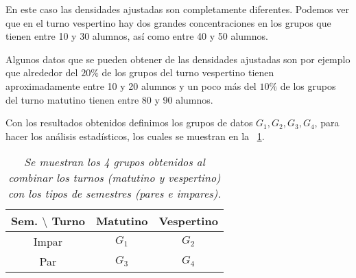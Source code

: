En este caso las densidades ajustadas son completamente diferentes. Podemos ver que en el turno vespertino hay dos grandes concentraciones en los grupos que tienen entre 10 y 30 alumnos, así como entre 40 y 50 alumnos.

Algunos datos que se pueden obtener de las densidades ajustadas son por ejemplo que alrededor del $20\%$ de los grupos del turno vespertino tienen aproximadamente entre 10 y 20 alumnos y un poco más del $10\%$ de los grupos del turno matutino tienen entre 80 y 90 alumnos.


Con los resultados obtenidos definimos los grupos de datos $G_{1}, G_{2}, G_{3}, G_{4}$, para hacer los análisis estadísticos, los cuales se muestran en la \tablename{~\ref{GposDatos}}.

\begin{table}[H]
\centering
\begin{tabular}{|c|c|c|}
\hline 
\textbf{Sem.} $\setminus$ \textbf{Turno} & \textbf{Matutino} & \textbf{Vespertino} \\ 
\hline 
Impar & $G_{1}$ & $G_{2}$ \\ 
\hline 
Par & $G_{3}$ & $G_{4}$ \\ 
\hline 
\end{tabular}
\caption[\textit{Grupos de datos}]{\textit{Se muestran los 4 grupos obtenidos al combinar los turnos (matutino y vespertino) con los tipos de semestres (pares e impares).}}\label{GposDatos}
\end{table}


